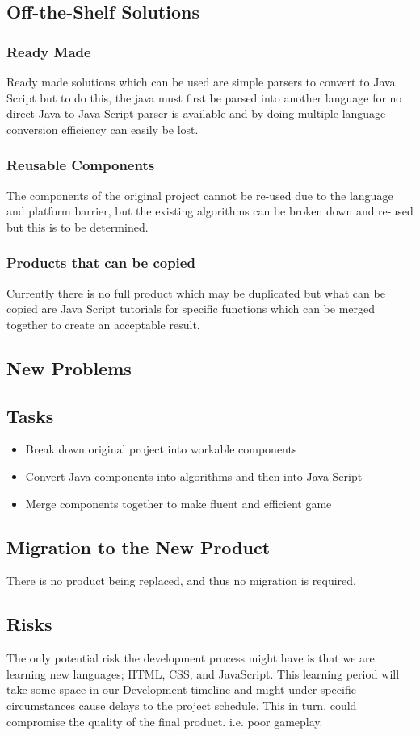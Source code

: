 \documentclass[12pt, titlepage]{article}
\begin{document}
\subsection{Off-the-Shelf Solutions}
\subsubsection{Ready Made}
Ready made solutions which can be used are simple parsers to convert to Java
Script but to do this, the java must first be parsed into another language for
no direct Java to Java Script parser is available and by doing multiple language
conversion efficiency can easily be lost.
\subsubsection{Reusable Components}
The components of the original project cannot be re-used due to the language and
platform barrier, but the existing algorithms can be broken down and re-used but
this is to be determined.
\subsubsection{Products that can be copied}
Currently there is no full product which may be duplicated but what can be
copied are Java Script tutorials for specific functions which can be merged
together to create an acceptable result.
\subsection{New Problems}
\subsection{Tasks}
\begin{itemize}
\item Break down original project into workable components
\item Convert Java components into algorithms and then into Java Script
\item Merge components together to make fluent and efficient game
\end{itemize}
\subsection{Migration to the New Product}
There is no product being replaced, and thus no migration is required.
\subsection{Risks}
The only potential risk the development process might have is that we are
learning new languages; HTML, CSS, and JavaScript. This learning period will
take some space in our Development timeline and might under specific
circumstances cause delays to the project schedule. This in turn, could
compromise the quality of the final product. i.e. poor gameplay.
\end{document}
